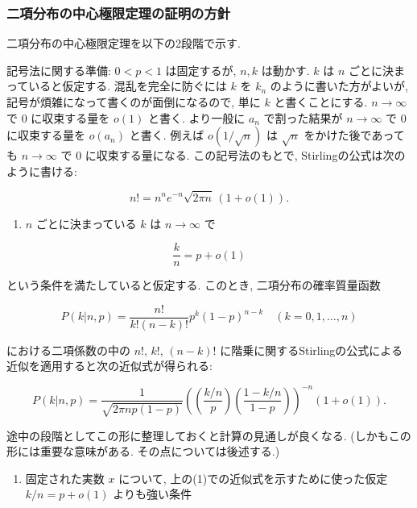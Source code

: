 \documentclass[
  letterpaper,
  DIV=11,
  numbers=noendperiod]{scrartcl}
\providecommand{\tightlist}{%
  \setlength{\itemsep}{0pt}\setlength{\parskip}{0pt}}\usepackage{longtable,booktabs,array}
\begin{document}
\hypertarget{ux4e8cux9805ux5206ux5e03ux306eux4e2dux5fc3ux6975ux9650ux5b9aux7406ux306eux8a3cux660eux306eux65b9ux91dd}{%
\subsubsection{二項分布の中心極限定理の証明の方針}\label{ux4e8cux9805ux5206ux5e03ux306eux4e2dux5fc3ux6975ux9650ux5b9aux7406ux306eux8a3cux660eux306eux65b9ux91dd}}

二項分布の中心極限定理を以下の2段階で示す.

記号法に関する準備: \(0 < p < 1\) は固定するが, \(n, k\) は動かす. \(k\)
は \(n\) ごとに決まっていると仮定する. 混乱を完全に防ぐには \(k\) を
\(k_n\) のように書いた方がよいが,
記号が煩雑になって書くのが面倒になるので, 単に \(k\) と書くことにする.
\(n\to\infty\) で \(0\) に収束する量を \(o(1)\) と書く. より一般に
\(a_n\) で割った結果が \(n\to\infty\) で \(0\) に収束する量を \(o(a_n)\)
と書く. 例えば \(o\left(1/\sqrt{n}\right)\) は \(\sqrt{n}\)
をかけた後であっても \(n\to\infty\) で \(0\) に収束する量になる.
この記号法のもとで, Stirlingの公式は次のように書ける:

\[
n! = n^n e^{-n} \sqrt{2\pi n}\,(1 + o(1)).
\]

\begin{enumerate}
\def\labelenumi{(\arabic{enumi})}
\tightlist
\item
  \(n\) ごとに決まっている \(k\) は \(n\to\infty\) で
\end{enumerate}

\[
\frac{k}{n} = p + o(1)
\]

という条件を満たしていると仮定する. このとき, 二項分布の確率質量函数

\[
P(k|n,p) = \frac{n!}{k!(n-k)!} p^k(1-p)^{n-k} \quad (k=0,1,\ldots,n)
\]

における二項係数の中の \(n!\), \(k!\), \((n-k)!\)
に階乗に関するStirlingの公式による近似を適用すると次の近似式が得られる:

\[
P(k|n,p) = \frac{1}{\sqrt{2\pi np(1-p)}}
\left(\left(\frac{k/n}{p}\right)\left(\frac{1-k/n}{1-p}\right)\right)^{-n}(1 + o(1)).
\]

途中の段階としてこの形に整理しておくと計算の見通しが良くなる.
(しかもこの形には重要な意味がある. その点については後述する.)

\begin{enumerate}
\def\labelenumi{(\arabic{enumi})}
\setcounter{enumi}{1}
\tightlist
\item
  固定された実数 \(x\) について, 上の(1)での近似式を示すために使った仮定
  \(k/n = p + o(1)\) よりも強い条件
\end{enumerate}
\end{document}

